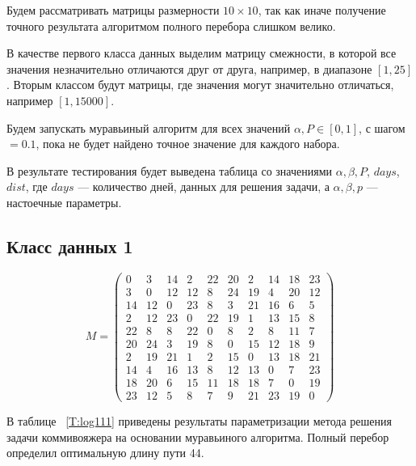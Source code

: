 \documentclass[12pt]{report}
\begin{document}
Будем рассматривать матрицы размерности $10\times10$, так как иначе получение точного результата алгоритмом полного перебора слишком велико.

В качестве первого класса данных выделим матрицу смежности, в которой все значения незначительно отличаются друг от друга, например, в диапазоне $[1, 25]$.
Вторым классом будут матрицы, где значения могут значительно отличаться, например $[1, 15000]$.

Будем запускать муравьиный алгоритм для всех значений $\alpha, P\in[0, 1]$, с шагом $= 0.1$, пока не будет найдено точное значение для каждого набора.

В результате тестирования будет выведена таблица со значениями $\alpha, \beta, P$, $days$, $ dist$, где $days$ — количество дней, данных для решения задачи, а $\alpha, \beta, p$ — настоечные параметры.

\subsection{Класс данных 1}
\begin{equation}
\label{matrix}
	M = \begin{pmatrix}
		0 &  3 & 14 &  2 & 22 & 20 &  2 & 14 & 18 & 23\\
		3 &  0 & 12 & 12 &  8 & 24 & 19 &  4 & 20 & 12\\
		14 & 12 & 0 & 23 &  8 &  3 & 21 & 16 &  6 &  5\\
		2 & 12 & 23 &  0 & 22 & 19 &  1 & 13 & 15  & 8\\
		22 &  8 &  8 & 22 &  0 &  8 &  2  & 8 & 11 &  7\\
		20 & 24 &  3 & 19 &  8  & 0 & 15 & 12 & 18  & 9\\
		2 & 19 & 21  & 1 &  2 & 15  & 0 & 13 & 18 & 21\\
		14 &  4 & 16 & 13 &  8 & 12 & 13 &  0 &  7 & 23\\
		18 & 20 &  6 & 15 & 11 & 18 & 18 &  7 &  0 & 19\\
		23 & 12 &  5  & 8 &  7 &  9 & 21 & 23 & 19 &  0
	\end{pmatrix}
\end{equation}

В таблице ~\ref{T:log111} приведены результаты параметризации метода решения задачи коммивояжера на основании муравьиного алгоритма. Полный перебор определил оптимальную длину пути 44.
\end{document}
